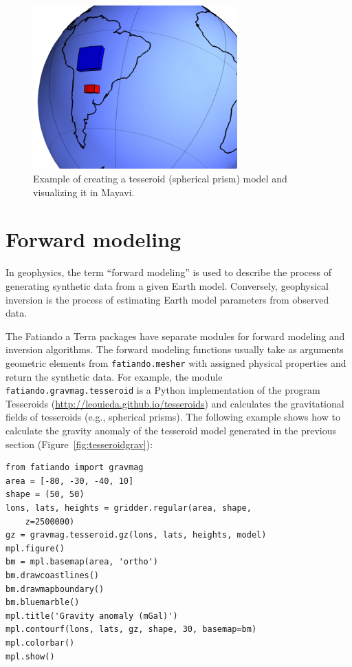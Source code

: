 \begin{figure}
    \centering
    \includegraphics[width=0.7\textwidth]{figures/paper1/meshes_3dplotting_tesseroid}
    \caption{
        Example of creating a tesseroid (spherical prism) model and visualizing
        it in Mayavi.
    }
    \label{fig:tesseroid}
\end{figure}




\section{Forward modeling}

In geophysics, the term ``forward modeling'' is used to describe the
process of generating synthetic data from a given Earth model.
Conversely, geophysical inversion is the process of estimating Earth
model parameters from observed data.

The Fatiando a Terra packages have separate modules for forward modeling
and inversion algorithms. The forward modeling functions usually take as
arguments geometric elements from \texttt{fatiando.mesher} with assigned
physical properties and return the synthetic data. For example, the
module \texttt{fatiando.gravmag.tesseroid} is a Python implementation of
the program Tesseroids (\url{http://leouieda.github.io/tesseroids}) and
calculates the gravitational fields of tesseroids (e.g., spherical
prisms). The following example shows how to calculate the gravity
anomaly of the tesseroid model generated in the previous section
(Figure~\ref{fig:tesseroidgrav}):

\begin{verbatim}
from fatiando import gravmag
area = [-80, -30, -40, 10]
shape = (50, 50)
lons, lats, heights = gridder.regular(area, shape,
    z=2500000)
gz = gravmag.tesseroid.gz(lons, lats, heights, model)
mpl.figure()
bm = mpl.basemap(area, 'ortho')
bm.drawcoastlines()
bm.drawmapboundary()
bm.bluemarble()
mpl.title('Gravity anomaly (mGal)')
mpl.contourf(lons, lats, gz, shape, 30, basemap=bm)
mpl.colorbar()
mpl.show()
\end{verbatim}


